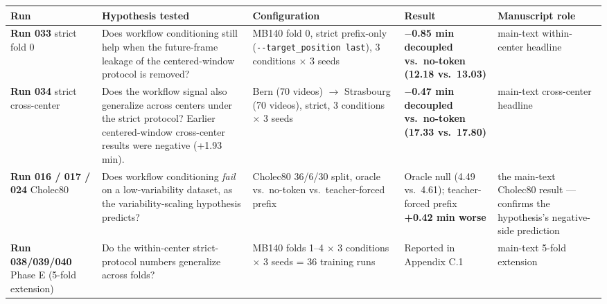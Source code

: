 \begin{longtable}[]{@{}
  >{\raggedright\arraybackslash}p{}
  >{\raggedright\arraybackslash}p{}
  >{\raggedright\arraybackslash}p{}
  >{\raggedright\arraybackslash}p{}
  >{\raggedright\arraybackslash}p{}@{}}
\toprule\noalign{}
\begin{minipage}[b]{\linewidth}\raggedright
Run
\end{minipage} & \begin{minipage}[b]{\linewidth}\raggedright
Hypothesis tested
\end{minipage} & \begin{minipage}[b]{\linewidth}\raggedright
Configuration
\end{minipage} & \begin{minipage}[b]{\linewidth}\raggedright
Result
\end{minipage} & \begin{minipage}[b]{\linewidth}\raggedright
Manuscript role
\end{minipage} \\
\midrule\noalign{}
\endhead
\bottomrule\noalign{}
\endlastfoot
\textbf{Run 033} strict fold 0 & Does workflow conditioning still help
when the future-frame leakage of the centered-window protocol is
removed? & MB140 fold 0, strict prefix-only
(\texttt{-\/-target\_position\ last}), 3 conditions $\times$ 3 seeds &
\textbf{$-$0.85 min decoupled vs.~no-token (12.18 vs.~13.03)} & main-text within-center headline \\
\textbf{Run 034} strict cross-center & Does the workflow signal also
generalize across centers under the strict protocol? Earlier
centered-window cross-center results were negative (+1.93 min). & Bern
(70 videos) $\rightarrow$ Strasbourg (70 videos), strict, 3 conditions $\times$ 3 seeds &
\textbf{$-$0.47 min decoupled vs.~no-token (17.33 vs.~17.80)} & main-text cross-center headline \\
\textbf{Run 016 / 017 / 024} Cholec80 & Does workflow conditioning
\emph{fail} on a low-variability dataset, as the variability-scaling
hypothesis predicts? & Cholec80 36/6/30 split, oracle vs.~no-token
vs.~teacher-forced prefix & Oracle null (4.49 vs.~4.61); teacher-forced
prefix \textbf{+0.42 min worse} & the main-text Cholec80 result --- confirms the hypothesis's
negative-side prediction \\
\textbf{Run 038/039/040} Phase E (5-fold extension) & Do the
within-center strict-protocol numbers generalize across folds? & MB140
folds 1--4 $\times$ 3 conditions $\times$ 3 seeds = 36 training runs & Reported in
Appendix C.1 & main-text 5-fold extension \\
\end{longtable}

